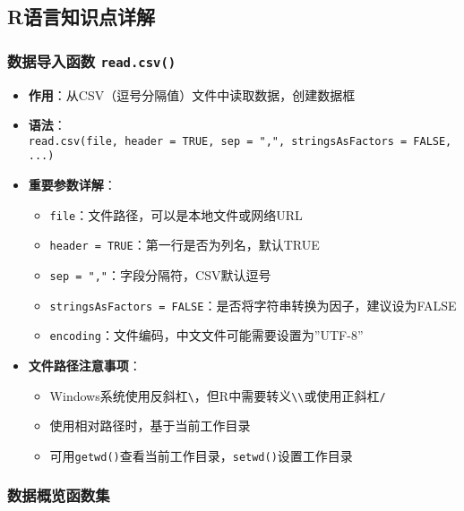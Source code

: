 \documentclass[
]{book}
\providecommand{\tightlist}{%
  \setlength{\itemsep}{0pt}\setlength{\parskip}{0pt}}
\begin{document}
\hypertarget{rux8bedux8a00ux77e5ux8bc6ux70b9ux8be6ux89e3-4}{%
\subsection{R语言知识点详解}\label{rux8bedux8a00ux77e5ux8bc6ux70b9ux8be6ux89e3-4}}

\hypertarget{ux6570ux636eux5bfcux5165ux51fdux6570-read.csv}{%
\subsubsection{\texorpdfstring{数据导入函数 \texttt{read.csv()}}{数据导入函数 read.csv()}}\label{ux6570ux636eux5bfcux5165ux51fdux6570-read.csv}}

\begin{itemize}
\tightlist
\item
  \textbf{作用}：从CSV（逗号分隔值）文件中读取数据，创建数据框
\item
  \textbf{语法}：\texttt{read.csv(file,\ header\ =\ TRUE,\ sep\ =\ ",",\ stringsAsFactors\ =\ FALSE,\ ...)}
\item
  \textbf{重要参数详解}：

  \begin{itemize}
  \tightlist
  \item
    \texttt{file}：文件路径，可以是本地文件或网络URL
  \item
    \texttt{header\ =\ TRUE}：第一行是否为列名，默认TRUE
  \item
    \texttt{sep\ =\ ","}：字段分隔符，CSV默认逗号
  \item
    \texttt{stringsAsFactors\ =\ FALSE}：是否将字符串转换为因子，建议设为FALSE
  \item
    \texttt{encoding}：文件编码，中文文件可能需要设置为''UTF-8''
  \end{itemize}
\item
  \textbf{文件路径注意事项}：

  \begin{itemize}
  \tightlist
  \item
    Windows系统使用反斜杠\texttt{\textbackslash{}}，但R中需要转义\texttt{\textbackslash{}\textbackslash{}}或使用正斜杠\texttt{/}
  \item
    使用相对路径时，基于当前工作目录
  \item
    可用\texttt{getwd()}查看当前工作目录，\texttt{setwd()}设置工作目录
  \end{itemize}
\end{itemize}

\hypertarget{ux6570ux636eux6982ux89c8ux51fdux6570ux96c6}{%
\subsubsection{数据概览函数集}\label{ux6570ux636eux6982ux89c8ux51fdux6570ux96c6}}
\end{document}
